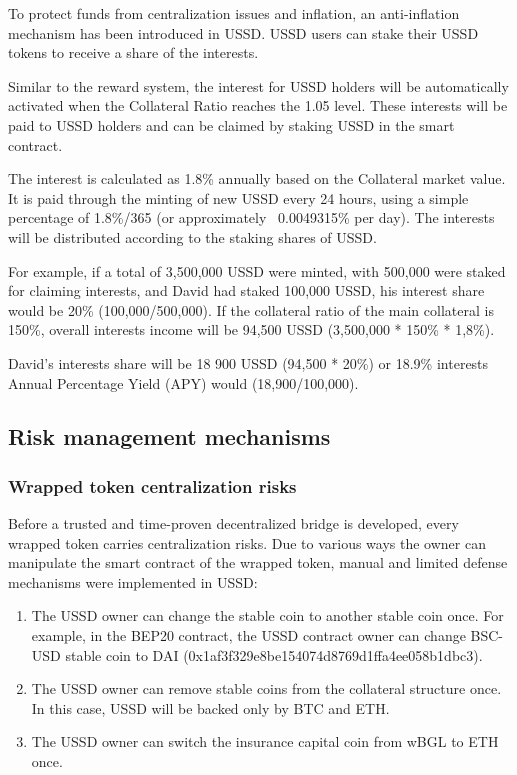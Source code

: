 To protect funds from centralization issues and inflation, an anti-inflation mechanism has been introduced in USSD. USSD users can stake their USSD tokens to receive a share of the interests.

Similar to the reward system, the interest for USSD holders will be automatically activated when the Collateral Ratio reaches the 1.05 level. These interests will be paid to USSD holders and can be claimed by staking USSD in the smart contract.

The interest is calculated as 1.8\% annually based on the Collateral market value. It is paid through the minting of new USSD every 24 hours, using a simple percentage of 1.8\%/365 (or approximately ~0.0049315\% per day). The interests will be distributed according to the staking shares of USSD.

For example, if a total of 3,500,000 USSD were minted, with 500,000 were staked for claiming interests, and David had staked 100,000 USSD, his interest share would be 20\% (100,000/500,000). If the collateral ratio of the main collateral is 150\%, overall interests income will be 94,500 USSD (3,500,000 * 150\% * 1,8\%).

David's interests share will be 18 900 USSD (94,500 * 20\%) or 18.9\% interests Annual Percentage Yield (APY) would (18,900/100,000).


\subsection{Risk management mechanisms}


\subsubsection{Wrapped token centralization risks}

Before a trusted and time-proven decentralized bridge is developed, every wrapped token carries centralization risks. Due to various ways the owner can manipulate the smart contract of the wrapped token, manual and limited defense mechanisms were implemented in USSD:

\begin{enumerate}
	\item The USSD owner can change the stable coin to another stable coin once. For example, in the BEP20 contract, the USSD contract owner can change BSC-USD stable coin to DAI (0x1af3f329e8be154074d8769d1ffa4ee058b1dbc3).
	\item The USSD owner can remove stable coins from the collateral structure once. In this case, USSD will be backed only by BTC and ETH.
	\item The USSD owner can switch the insurance capital coin from wBGL to ETH once.
\end{enumerate}

